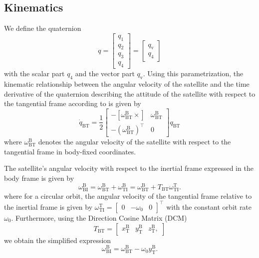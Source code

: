 \documentclass[pdflatex,sn-mathphys-num]{sn-jnl}%
\theoremstyle{thmstyleone}%
\theoremstyle{thmstyletwo}%
\theoremstyle{thmstylethree}%
\begin{document}
        \subsection{Kinematics}
		We define the quaternion
		\begin{equation}
			q = \begin{bmatrix}
				q_1 \\ q_2 \\q_3 \\ q_4
			\end{bmatrix}
			=
			\begin{bmatrix}
				q_\text{v} \\ q_4
			\end{bmatrix}
		\end{equation}
		with the scalar part $q_4$ and the vector part $q_\text{v}$. 
		Using this parametrization, the kinematic relationship between the angular velocity of the satellite and the time derivative of the quaternion describing the attitude of the satellite with respect to the tangential frame according to \cite{fichterPrinciplesSpacecraftControl2023} is given by
			\begin{equation}
				\label{eq:quaternion_kinematics}
				\dot{q}_{\text{BT}} = \frac{1}{2}\begin{bmatrix}
					-[\omega^{\text{B}}_{\text{BT}} \times] & \omega^{\text{B}}_{\text{BT}} \\
					-(\omega_{\text{BT}}^{\text{B}})^{\top} & 0
				\end{bmatrix}q_{\text{BT}}
			\end{equation}
		where $\omega_{\text{BT}}^{\text{B}}$ denotes the angular velocity of the satellite with respect to the tangential frame in body-fixed coordinates.

		The satellite's angular velocity with respect to the inertial frame expressed in the body frame is given by
		\begin{equation}
			\omega_{\text{BI}}^{\text{B}} = \omega_{\text{BT}}^{\text{B}} + \omega_{\text{TI}}^{\text{B}} 
			= \omega_{\text{BT}}^{\text{B}} + T_{\text{BT}}\omega_{\text{TI}}^{\text{T}}.
		\end{equation}
		where for a circular orbit, the angular velocity of the tangential frame relative to the inertial frame is given by $\omega_{\text{TI}}^{\text{T}} = \begin{bmatrix}
			0 & -\omega_0 & 0
		\end{bmatrix}^{\top}$ with the constant orbit rate $\omega_0$. Furthermore, using the Direction Cosine Matrix (DCM) 
		\begin{equation}
			T_{\text{BT}} = \begin{bmatrix}
				x^{\text{B}}_{\text{T}} & y^{\text{B}}_{\text{T}} & z^{\text{B}}_{\text{T}},
			\end{bmatrix}
		\end{equation}
		we obtain the simplified expression
		\begin{equation}
			\label{eq:inertial_rate_circular_orbit}
			\omega_{\text{BI}}^{\text{B}} = \omega_{\text{BT}}^{\text{B}} - \omega_0 y^{\text{B}}_{\text{T}}.
		\end{equation}
\end{document}
